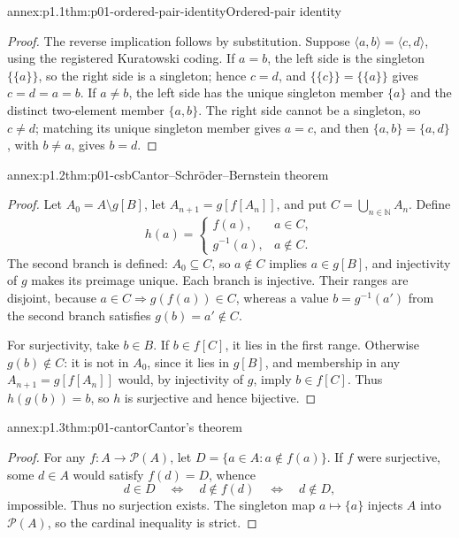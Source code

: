 \label{annex:p01}

\begin{annexitem}{annex:p1.1}{thm:p01-ordered-pair-identity}{Ordered-pair identity}
\begin{proof}
The reverse implication follows by substitution.  Suppose
\(\langle a,b\rangle=\langle c,d\rangle\), using the registered
Kuratowski coding.  If \(a=b\), the left side is the singleton
\(\{\{a\}\}\), so the right side is a singleton; hence \(c=d\), and
\(\{\{c\}\}=\{\{a\}\}\) gives \(c=d=a=b\).  If \(a\ne b\), the left
side has the unique singleton member \(\{a\}\) and the distinct two-element
member \(\{a,b\}\).  The right side cannot be a singleton, so \(c\ne d\);
matching its unique singleton member gives \(a=c\), and then
\(\{a,b\}=\{a,d\}\), with \(b\ne a\), gives \(b=d\).
\end{proof}
\end{annexitem}

\begin{annexitem}{annex:p1.2}{thm:p01-csb}{Cantor--Schr\"oder--Bernstein theorem}
\begin{proof}
Let \(A_0=A\setminus g[B]\), let \(A_{n+1}=g[f[A_n]]\), and put
\(C=\bigcup_{n\in\mathbb N}A_n\).  Define
\[
 h(a)=
 \begin{cases}
   f(a),&a\in C,\\
   g^{-1}(a),&a\notin C.
 \end{cases}
\]
The second branch is defined: \(A_0\subseteq C\), so \(a\notin C\)
implies \(a\in g[B]\), and injectivity of \(g\) makes its preimage unique.
Each branch is injective.  Their ranges are disjoint, because
\(a\in C\Rightarrow g(f(a))\in C\), whereas a value \(b=g^{-1}(a')\)
from the second branch satisfies \(g(b)=a'\notin C\).

For surjectivity, take \(b\in B\).  If \(b\in f[C]\), it lies in the first
range.  Otherwise \(g(b)\notin C\): it is not in \(A_0\), since it lies in
\(g[B]\), and membership in any
\(A_{n+1}=g[f[A_n]]\) would, by injectivity of \(g\), imply
\(b\in f[C]\).  Thus \(h(g(b))=b\), so \(h\) is surjective and hence
bijective.
\end{proof}
\end{annexitem}

\begin{annexitem}{annex:p1.3}{thm:p01-cantor}{Cantor's theorem}
\begin{proof}
For any \(f:A\to\mathcal P(A)\), let
\(D=\{a\in A:a\notin f(a)\}\).  If \(f\) were surjective, some
\(d\in A\) would satisfy \(f(d)=D\), whence
\[
 d\in D\quad\Longleftrightarrow\quad d\notin f(d)
 \quad\Longleftrightarrow\quad d\notin D,
\]
impossible.  Thus no surjection exists.  The singleton map
\(a\mapsto\{a\}\) injects \(A\) into \(\mathcal P(A)\), so the cardinal
inequality is strict.
\end{proof}
\end{annexitem}

